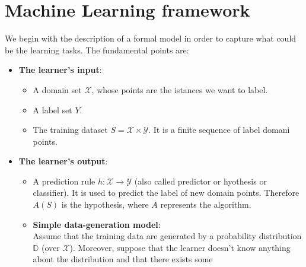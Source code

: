 \documentclass[../../main/main.tex]{subfiles}
\begin{document}
\chapter{Machine Learning framework}

We begin with the description of a formal model in order to capture what could be the learning tasks. The fundamental points are:

\begin{itemize}
    \item \textbf{The learner's input}:
    \begin{itemize}
        \item A domain set \( \mathcal{X} \), whose points are the istances we want to label.
        \item A label set \( Y \).
        \item The training dataset \( S = \mathcal{X} \times \mathcal{Y} \). It is a finite sequence of label domani points.
    \end{itemize}
    
    \item \textbf{The learner's output}:
    \begin{itemize}
        \item A prediction rule \( h: \mathcal{X} \to \mathcal{Y} \) (also called predictor or hyothesis or classifier). It is used to predict the label of new domain points. Therefore \( A(S) \) is the hypothesis, where \( A \) represents the algorithm.

        \item \textbf{Simple data-generation model}:\\
            Assume that the training data are generated by a probability distribution \( \mathbb{D} \) (over \( \mathcal{X} \)). Moreover, suppose that the learner doesn't know anything about the distribution and that there exists some 
    \end{itemize} 
\end{itemize}
\end{document}

